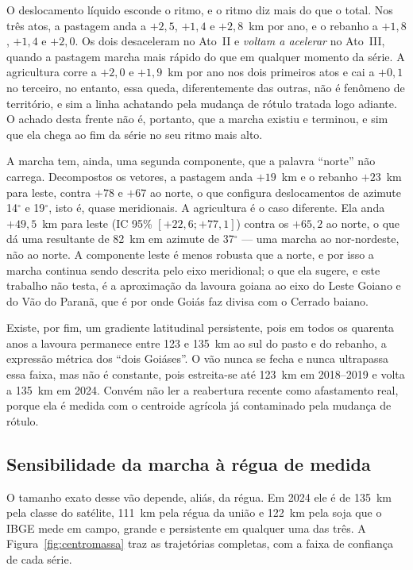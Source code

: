 O deslocamento líquido esconde o ritmo, e o ritmo diz mais do que o total. Nos
três atos, a pastagem anda a $+2{,}5$, $+1{,}4$ e $+2{,}8$~km por ano, e o
rebanho a $+1{,}8$, $+1{,}4$ e $+2{,}0$. Os dois desaceleram no Ato~II e
\emph{voltam a acelerar} no Ato~III, quando a pastagem marcha mais rápido do
que em qualquer momento da série. A agricultura corre a $+2{,}0$ e $+1{,}9$~km
por ano nos dois primeiros atos e cai a $+0{,}1$ no terceiro, no entanto, essa queda,
diferentemente das outras, não é fenômeno de território, e sim a linha
achatando pela mudança de rótulo tratada logo adiante. O achado desta frente
não é, portanto, que a marcha existiu e terminou, e sim que ela chega ao fim da
série no seu ritmo mais alto.

A marcha tem, ainda, uma segunda componente, que a palavra ``norte'' não
carrega. Decompostos os vetores, a pastagem anda $+19$~km e o rebanho $+23$~km
para leste, contra $+78$ e $+67$ ao norte, o que configura deslocamentos de azimute 14$^\circ$
e 19$^\circ$, isto é, quase meridionais. A agricultura é o caso diferente. Ela
anda $+49{,}5$~km para leste (IC 95\% $[+22{,}6; +77{,}1]$) contra os
$+65{,}2$ ao norte, o que dá uma resultante de 82~km em azimute de
37$^\circ$ --- uma marcha ao nor-nordeste, não ao norte. A componente leste é
menos robusta que a norte, e por isso a marcha continua sendo descrita pelo
eixo meridional; o que ela sugere, e este trabalho não testa, é a aproximação
da lavoura goiana ao eixo do Leste Goiano e do Vão do Paranã, que é por onde
Goiás faz divisa com o Cerrado baiano.

Existe, por fim, um gradiente latitudinal persistente, pois em todos os quarenta
anos a lavoura permanece entre 123 e 135~km ao sul do pasto e do rebanho, a
expressão métrica dos ``dois Goiáses''. O vão nunca se fecha e nunca ultrapassa
essa faixa, mas não é constante, pois estreita-se até 123~km em 2018--2019 e volta a
135~km em 2024. Convém não ler a reabertura recente como afastamento real,
porque ela é medida com o centroide agrícola já contaminado pela mudança de
rótulo.

\subsection{Sensibilidade da marcha à régua de medida}

O tamanho exato desse vão depende, aliás, da régua. Em 2024 ele é de 135~km
pela classe do satélite, 111~km pela régua da união e 122~km pela soja que o
IBGE mede em campo, grande e persistente em qualquer uma das três. A
Figura~\ref{fig:centromassa} traz as trajetórias completas, com a faixa de
confiança de cada série.

